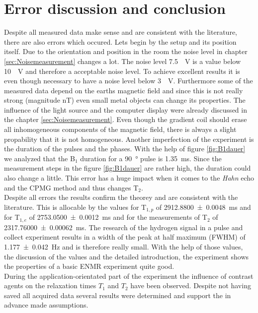 \section{Error discussion and conclusion}
\label{sec:Fazit}
Despite all measured data make sense and are consistent with the literature, there are also errors which occured. Lets begin by the setup and its position itself. Due to the orientation and position in the room the noise level in chapter \ref{sec:Noisemeasurement} changes a lot. The noise level \SI{7.5}{\mu \volt} is a value below \SI{10}{\mu \volt} and therefore a acceptable noise level. To achieve excellent results it is even though necessary to have a noise level below \SI{3}{\mu \volt}. Furthermore some of the measured data depend on the earths magnetic field and since this is not really strong (magnitude \si{\nano \tesla}) even small metal objects can change its properties. The influence of the light source and the computer display were already discussed in the chapter \ref{sec:Noisemeasurement}. Even though the gradient coil should erase all inhomogeneous components of the magnetic field, there is always a slight propability that it is not homogeneous.\newline
Another imperfection of the experiment is the duration of the pulses and the phases. With the help of figure \ref{fig:B1dauer} we analyzed that the B$_1$ duration for a \SI{90}{\degree} pulse is \SI{1.35}{\milli \second}. Since the measurement steps in the figure \ref{fig:B1dauer} are rather high, the duration could also change a little. This error has a huge impact when it comes to the \textit{Hahn} echo and the CPMG method and thus changes T$_2$.
\\
Despite all errors the results confirm the theorey and are consistent with the literature. This is allocable by the values for T$_{1,p}$ of \SI{2912.8800 \pm 0.0048}{\milli \second} and for T$_{1,e}$ of \SI{2753.0500 \pm 0.0012}{\milli \second} and for the measurements of T$_2$ of \SI{2317.76000 \pm 0.00062}{\milli \second}. The research of the hydrogen signal in a pulse and collect experiment results in a width of the peak at half maximum (FWHM) of \SI{1.177 \pm 0.042}{\hertz} and is therefore really small. With the help of those values, the discussion of the values and the detailed introduction, the experiment shows the properties of a basic ENMR experiment quite good.\\
During the application-orientated part of the experiment the influence of contrast agents on the relaxation times $T_1$ and $T_2$ have been observed. Despite not having saved all acquired data several results were determined and support the in advance made assumptions.
